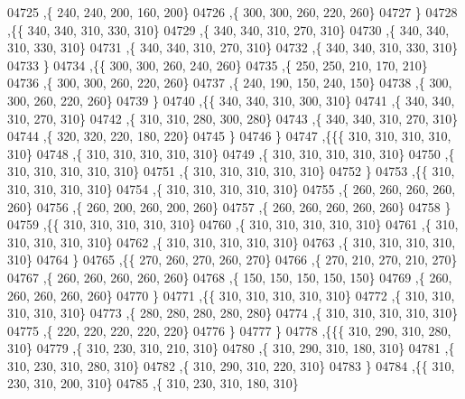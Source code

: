 \begin{DoxyCode}
04725     ,\{   240,   240,   200,   160,   200\}
04726     ,\{   300,   300,   260,   220,   260\}
04727     \}
04728    ,\{\{   340,   340,   310,   330,   310\}
04729     ,\{   340,   340,   310,   270,   310\}
04730     ,\{   340,   340,   310,   330,   310\}
04731     ,\{   340,   340,   310,   270,   310\}
04732     ,\{   340,   340,   310,   330,   310\}
04733     \}
04734    ,\{\{   300,   300,   260,   240,   260\}
04735     ,\{   250,   250,   210,   170,   210\}
04736     ,\{   300,   300,   260,   220,   260\}
04737     ,\{   240,   190,   150,   240,   150\}
04738     ,\{   300,   300,   260,   220,   260\}
04739     \}
04740    ,\{\{   340,   340,   310,   300,   310\}
04741     ,\{   340,   340,   310,   270,   310\}
04742     ,\{   310,   310,   280,   300,   280\}
04743     ,\{   340,   340,   310,   270,   310\}
04744     ,\{   320,   320,   220,   180,   220\}
04745     \}
04746    \}
04747   ,\{\{\{   310,   310,   310,   310,   310\}
04748     ,\{   310,   310,   310,   310,   310\}
04749     ,\{   310,   310,   310,   310,   310\}
04750     ,\{   310,   310,   310,   310,   310\}
04751     ,\{   310,   310,   310,   310,   310\}
04752     \}
04753    ,\{\{   310,   310,   310,   310,   310\}
04754     ,\{   310,   310,   310,   310,   310\}
04755     ,\{   260,   260,   260,   260,   260\}
04756     ,\{   260,   200,   260,   200,   260\}
04757     ,\{   260,   260,   260,   260,   260\}
04758     \}
04759    ,\{\{   310,   310,   310,   310,   310\}
04760     ,\{   310,   310,   310,   310,   310\}
04761     ,\{   310,   310,   310,   310,   310\}
04762     ,\{   310,   310,   310,   310,   310\}
04763     ,\{   310,   310,   310,   310,   310\}
04764     \}
04765    ,\{\{   270,   260,   270,   260,   270\}
04766     ,\{   270,   210,   270,   210,   270\}
04767     ,\{   260,   260,   260,   260,   260\}
04768     ,\{   150,   150,   150,   150,   150\}
04769     ,\{   260,   260,   260,   260,   260\}
04770     \}
04771    ,\{\{   310,   310,   310,   310,   310\}
04772     ,\{   310,   310,   310,   310,   310\}
04773     ,\{   280,   280,   280,   280,   280\}
04774     ,\{   310,   310,   310,   310,   310\}
04775     ,\{   220,   220,   220,   220,   220\}
04776     \}
04777    \}
04778   ,\{\{\{   310,   290,   310,   280,   310\}
04779     ,\{   310,   230,   310,   210,   310\}
04780     ,\{   310,   290,   310,   180,   310\}
04781     ,\{   310,   230,   310,   280,   310\}
04782     ,\{   310,   290,   310,   220,   310\}
04783     \}
04784    ,\{\{   310,   230,   310,   200,   310\}
04785     ,\{   310,   230,   310,   180,   310\}

\end{DoxyCode}
